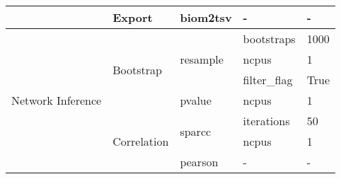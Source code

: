 \begin{table}[h]
{\begin{tabular}{lllll}
                                          & Export                                                   & biom2tsv                               & -                                      & -                                                                                                        \\ \hline
\multirow{17}{*}{Network Inference}       & \multirow{4}{*}{Bootstrap}                               & \multirow{3}{*}{resample}              & bootstraps                             & 1000                                                                                                     \\
                                          &                                                          &                                        & ncpus                                  & 1                                                                                                        \\
                                          &                                                          &                                        & filter\_flag                           & True                                                                                                     \\
                                          &                                                          & pvalue                                 & ncpus                                  & 1                                                                                                        \\ \cline{2-5}
                                          & \multirow{12}{*}{Correlation}                            & \multirow{2}{*}{sparcc}                & iterations                             & 50                                                                                                       \\
                                          &                                                          &                                        & ncpus                                  & 1                                                                                                        \\
                                          &                                                          & pearson                                & -                                      & -                                                                                                        \\

\end{tabular}}
\end{table}
